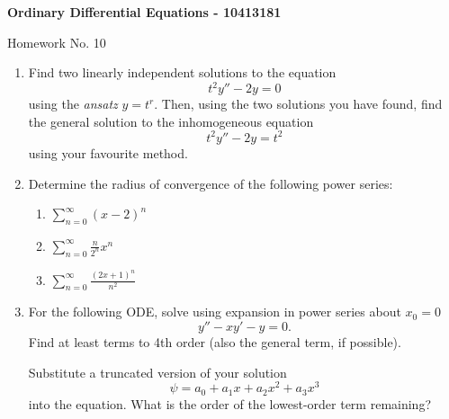 \documentclass[10pt,a4paper]{letter}
\begin{document}
\begin{center}
\begin{Large}
\textbf{Ordinary Differential Equations - 10413181}\\
\end{Large}
\vspace{1em}
\begin{large}Homework No. 10\end{large}
\end{center}

\begin{enumerate}
\item Find two linearly independent solutions to the equation 
\[ t^2 y'' - 2y = 0 \]
using the \emph{ansatz} $y = t^r.$ Then, using the two solutions you have found, find the general solution to the inhomogeneous equation
\[ t^2 y'' - 2y = t^2 \]
using your favourite method.
\item Determine the radius of convergence of the following power series:
\begin{enumerate}
\item $\sum_{n=0}^\infty (x-2)^n$
\item $\sum_{n=0}^\infty \frac{n}{2^n}x^n $
\item $\sum_{n=0}^\infty \frac{(2x+1)^n}{n^2}$
\end{enumerate}
\item For the following ODE, solve using expansion in power series about $x_0 = 0$
\[y'' - xy' - y = 0.\]
Find at least terms to 4th order (also the general term, if possible).

Substitute a truncated version of your solution 
\[ \psi = a_0 + a_1 x + a_2 x^2 + a_3 x^3 \]
into the equation. What is the order of the lowest-order term remaining?
\end{enumerate}
\end{document}
